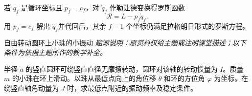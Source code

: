 若 $q_f$ 是循环坐标且 $p_f=c_f$，对 $\dot q_f$ 作勒让德变换得罗斯函数
\begin{equation}\label{advA1:eq:routhian}
 \mathcal R=L-p_f\dot q_f.
\end{equation}
用 $p_f=c_f$ 解出 $\dot q_f$并代回后，其余 $f-1$ 个坐标仍满足拉格朗日形式的罗斯方程。

\begin{advexamplebox}{自由转动圆环上小珠的小振动}\label{advA1:ex:routh-hoop}
\emph{题源说明：原资料仅给主题或注明课堂描述；以下条件为依据主题所作的教学补全。}\par
半径 $a$ 的竖直圆环可绕竖直直径无摩擦转动，圆环对该轴的转动惯量为 $I$。质量 $m$ 的小珠在环上滑动。以珠从最低点向上的角位移 $\theta$ 和环的方位角 $\varphi$ 为坐标。在绕竖直轴角动量为 $J$ 时，求最低点附近的振动频率及稳定条件。

\begin{qualityfigure}
\label{advA1:fig:quality-routh-hoop-q}
\end{qualityfigure}
\end{advexamplebox}
\AdvHideHeadingtrue
